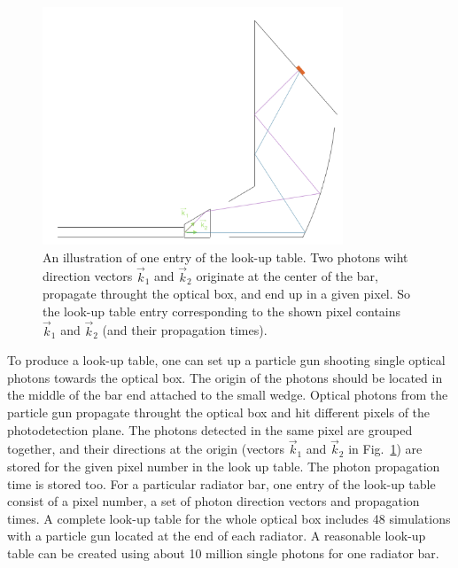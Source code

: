 \documentclass[11pt, a4paper]{article}
\begin{document}
\begin{figure}[!h]
\centering
\includegraphics[width=0.8\textwidth]{pics/lut1.png}
\caption{\label{pic:lut2}
An illustration of one entry of the look-up table. Two photons wiht direction vectors $\vec k_{1}$ and $\vec k_{2}$ originate at the center of the bar, propagate throught the optical box, and end up in a given pixel. So the look-up table entry corresponding to the shown pixel contains $\vec k_{1}$ and $\vec k_{2}$ (and their propagation times).
}
\end{figure}

To produce a look-up table, one can set up a particle gun shooting single optical photons towards the optical box. The origin of the photons should be located in the middle of the bar end attached to the small wedge. Optical photons from the particle gun propagate throught the optical box and hit different pixels of the photodetection plane. The photons detected in the same pixel are grouped together, and their directions at the origin (vectors $\vec k_1$ and $\vec k_2$ in Fig.~\ref{pic:lut2}) are stored for the given pixel number in the look up table. The photon propagation time is stored too. For a particular radiator bar, one entry of the look-up table consist of a pixel number, a set of photon direction vectors and propagation times. A complete look-up table for the whole optical box includes 48 simulations with a particle gun located at the end of each radiator. A reasonable look-up table can be created using about 10 million single photons for one radiator bar.
\end{document}
